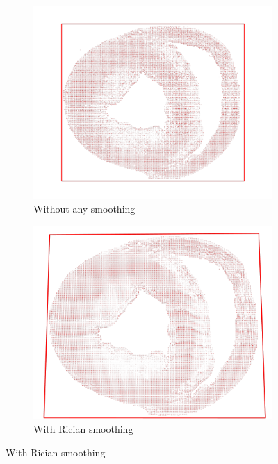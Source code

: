 \begin{figure}[h!]
    \centering
    \begin{subfigure}{.48\textwidth}
        \includegraphics[width=\textwidth]{figures/pig4_topview_no_smooth}
        \caption{Without any smoothing}
        \label{fig:pig4_topview_no_smooth}
    \end{subfigure}
    \begin{subfigure}{.48\textwidth}
        \includegraphics[width=\textwidth]{figures/pig4_topview_smooth}
        \caption{With Rician smoothing}
        \label{fig:pig4_topview_smooth}
    \end{subfigure}

\end{figure}
